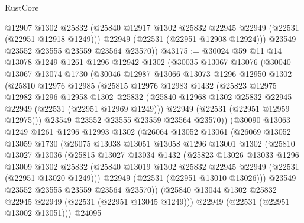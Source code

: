 \begin{lexlean}{RustCore}
\begin{coremodule}
          @12907
          @1302
          @25832
          (@25840 @12917 @1302 @25832 @22945 @22949 (@22531 (@22951 @12918 @1249)))
          @22949
          (@22531 (@22951 @12908 @12924)))
        @23549
        @23552
        @23555
        @23559
        @23564
        @23570))
@43175 := @30024
    @59
    @11
    @14
    @13078
    @1249
    @1261
    @1296
    @12942
    @1302
    (@30035
      @13067
      @13076
      (@30040
        @13067
        @13074
        @1730
        (@30046
          @12987
          @13066
          @13073
          @1296
          @12950
          @1302
          (@25810
            @12976
            @12985
            (@25815
              @12976
              @12983
              @1432
              (@25823
                @12975
                @12982
                @1296
                @12958
                @1302
                @25832
                (@25840 @12968 @1302 @25832 @22945 @22949 (@22531 (@22951 @12969 @1249)))
                @22949
                (@22531 (@22951 @12959 @12975)))
              @23549
              @23552
              @23555
              @23559
              @23564
              @23570))
          (@30090
            @13063
            @1249
            @1261
            @1296
            @12993
            @1302
            (@26064
              @13052
              @13061
              (@26069
                @13052
                @13059
                @1730
                (@26075
                  @13038
                  @13051
                  @13058
                  @1296
                  @13001
                  @1302
                  (@25810
                    @13027
                    @13036
                    (@25815
                      @13027
                      @13034
                      @1432
                      (@25823
                        @13026
                        @13033
                        @1296
                        @13009
                        @1302
                        @25832
                        (@25840 @13019 @1302 @25832 @22945 @22949 (@22531 (@22951 @13020 @1249)))
                        @22949
                        (@22531 (@22951 @13010 @13026)))
                      @23549
                      @23552
                      @23555
                      @23559
                      @23564
                      @23570))
                  (@25840 @13044 @1302 @25832 @22945 @22949 (@22531 (@22951 @13045 @1249)))
                  @22949
                  (@22531 (@22951 @13002 @13051)))
                @24095

\end{coremodule}
\end{lexlean}
